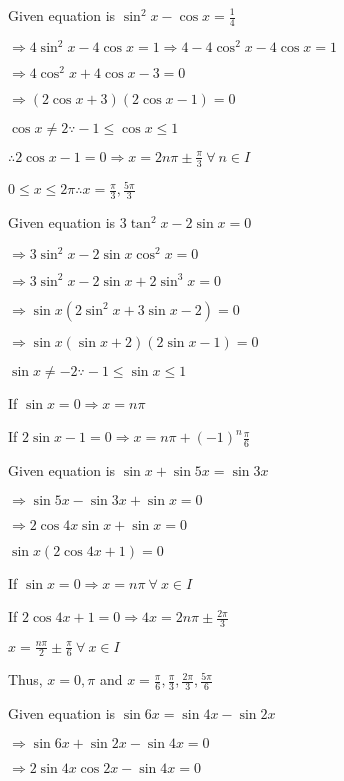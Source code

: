 \item Given equation is $\sin^2x - \cos x = \frac{1}{4}$

  $\Rightarrow 4\sin^2x - 4\cos x = 1 \Rightarrow 4 - 4\cos^2x - 4\cos x = 1$

  $\Rightarrow 4\cos^2x + 4\cos x -3 = 0$

  $\Rightarrow (2\cos x + 3)(2\cos x - 1) = 0$

  $\cos x \neq 2 \because -1\leq \cos x\leq 1$

  $\therefore 2\cos x - 1 = 0\Rightarrow x = 2n\pi \pm \frac{\pi}{3}~\forall~n\in I$

  $0\leq x \leq 2\pi \therefore x = \frac{\pi}{3}, \frac{5\pi}{3}$

\item Given equation is $3\tan^2x - 2\sin x = 0$

  $\Rightarrow 3\sin^2x - 2\sin x\cos^2x = 0$

  $\Rightarrow 3\sin^2x - 2\sin x + 2\sin^3x = 0$

  $\Rightarrow \sin x(2\sin^2x + 3\sin x - 2) = 0$

  $\Rightarrow \sin x(\sin x + 2)(2\sin x - 1) = 0$

  $\sin x\neq -2 \because -1\leq \sin x\leq 1$

  If $\sin x = 0 \Rightarrow x = n\pi$

  If $2\sin x - 1 = 0 \Rightarrow x = n\pi + (-1)^n\frac{\pi}{6}$

\item Given equation is $\sin x + \sin5x = \sin 3x$

  $\Rightarrow \sin5x - \sin3x + \sin x = 0$

  $\Rightarrow 2\cos4x\sin x + \sin x = 0$

  $\sin x(2\cos 4x + 1) = 0$

  If $\sin x = 0\Rightarrow x = n\pi~\forall~x\in I$

  If $2\cos4x + 1 = 0 \Rightarrow 4x = 2n\pi \pm\frac{2\pi}{3}$

  $x = \frac{n\pi}{2}\pm \frac{\pi}{6}~\forall~x\in I$

  Thus, $x = 0, \pi$ and $x = \frac{\pi}{6}, \frac{\pi}{3}, \frac{2\pi}{3}, \frac{5\pi}{6}$

\item Given equation is $\sin6x = \sin4x - \sin2x$

  $\Rightarrow \sin6x + \sin2x - \sin4x = 0$

  $\Rightarrow 2\sin4x\cos2x - \sin4x = 0$


